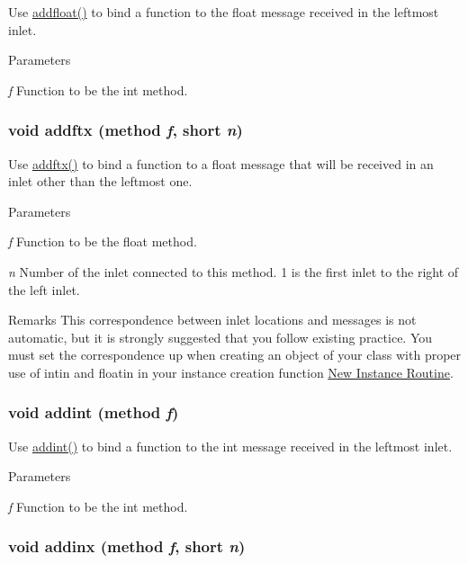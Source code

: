 Use \hyperlink{group__class__old_ga1e2089acfa6856835613d130a5b6bd7d}{addfloat()} to bind a function to the float message received in the leftmost inlet. 
\begin{DoxyParams}{Parameters}
\item[{\em f}]Function to be the int method. \end{DoxyParams}
\hypertarget{group__class__old_gad223143c8da12d8f3b7b18f9d6e5da9e}{
\subsubsection[{addftx}]{\setlength{\rightskip}{0pt plus 5cm}void addftx ({\bf method} {\em f}, \/  short {\em n})}}
\label{group__class__old_gad223143c8da12d8f3b7b18f9d6e5da9e}


Use \hyperlink{group__class__old_gad223143c8da12d8f3b7b18f9d6e5da9e}{addftx()} to bind a function to a float message that will be received in an inlet other than the leftmost one. 
\begin{DoxyParams}{Parameters}
\item[{\em f}]Function to be the float method. \item[{\em n}]Number of the inlet connected to this method. 1 is the first inlet to the right of the left inlet.\end{DoxyParams}
\begin{DoxyRemark}{Remarks}
This correspondence between inlet locations and messages is not automatic, but it is strongly suggested that you follow existing practice. You must set the correspondence up when creating an object of your class with proper use of intin and floatin in your instance creation function \hyperlink{chapter_anatomy_chapter_anatomy_object_new}{New Instance Routine}. 
\end{DoxyRemark}
\hypertarget{group__class__old_ga85afc0cd451465117ac80593d3deb4f9}{
\subsubsection[{addint}]{\setlength{\rightskip}{0pt plus 5cm}void addint ({\bf method} {\em f})}}
\label{group__class__old_ga85afc0cd451465117ac80593d3deb4f9}


Use \hyperlink{group__class__old_ga85afc0cd451465117ac80593d3deb4f9}{addint()} to bind a function to the int message received in the leftmost inlet. 
\begin{DoxyParams}{Parameters}
\item[{\em f}]Function to be the int method. \end{DoxyParams}
\hypertarget{group__class__old_gad3a69b2d38b257464c6a0f8a50efd85a}{
\subsubsection[{addinx}]{\setlength{\rightskip}{0pt plus 5cm}void addinx ({\bf method} {\em f}, \/  short {\em n})}}
\label{group__class__old_gad3a69b2d38b257464c6a0f8a50efd85a}


